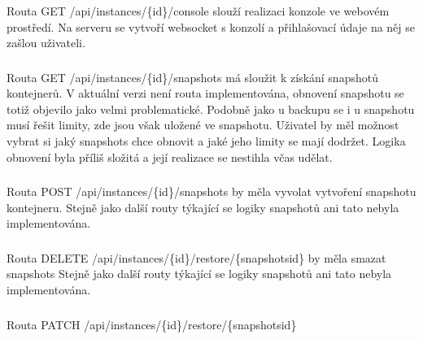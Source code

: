 \documentclass[a4paper,oneside,12pt]{report}
\begin{document}
Routa GET /api/instances/\{id\}/console slouží realizaci konzole ve webovém prostředí.
Na serveru se vytvoří websocket s konzolí a přihlašovací údaje na něj se zašlou uživateli.

\subsubsection{}

Routa GET /api/instances/\{id\}/snapshots má sloužit k získání snapshotů kontejnerů.
V aktuální verzi není routa implementována, obnovení snapshotu se totiž objevilo jako velmi problematické.
Podobně jako u backupu se i u snapshotu musí řešit limity, zde jsou však uložené ve snapshotu.
Uživatel by měl možnost vybrat si jaký snapshots chce obnovit a jaké jeho limity se mají dodržet.
Logika obnovení byla příliš složitá a její realizace se nestihla včas udělat.


\subsubsection{}

Routa POST /api/instances/\{id\}/snapshots by měla vyvolat vytvoření snapshotu kontejneru.
Stejně jako další routy týkající se logiky snapshotů ani tato nebyla implementována.

\subsubsection{}

Routa DELETE /api/instances/\{id\}/restore/\{snapshotsid\} by měla smazat snapshots
Stejně jako další routy týkající se logiky snapshotů ani tato nebyla implementována.

\subsubsection{}

Routa PATCH /api/instances/\{id\}/restore/\{snapshotsid\}

\subsubsection{}
\end{document}
